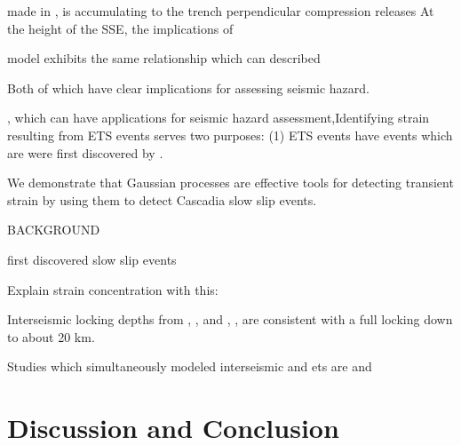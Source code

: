 \documentclass[10pt,a4paper]{article}
\begin{document}
made in ,  is accumulating to the trench perpendicular compression releases At the height of the SSE, the implications of    
  
model exhibits the same relationship  which can described  


Both of which have clear implications for assessing seismic hazard.

, which can have applications for seismic hazard assessment,Identifying strain resulting from ETS events serves two purposes: (1) ETS events have  events which are  were first discovered by \citet{Dragert2001}.   


We demonstrate that Gaussian processes are effective tools for detecting transient strain by using them to detect Cascadia slow slip events.  

BACKGROUND

\citet{Dragert2001} first discovered slow slip events

Explain strain concentration with this:

 
Interseismic locking depths from \citet{Fluck1997}, \citet{Murray2000}, \citet{McCaffrey2007} and \citet{McCaffrey2013}, \citet{Burgette2009}, \citet{schmalzle2014} are consistent with a full locking down to about 20 km.

Studies which simultaneously modeled interseismic and ets are \citet{Holtkamp2010} and \citet{schmalzle2014}


\section{Discussion and Conclusion}\label{sec:Discussion}





\end{document}

